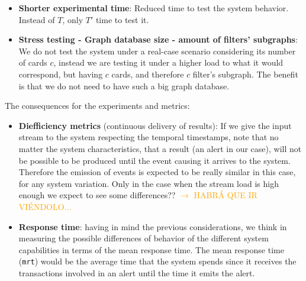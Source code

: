 \begin{itemize}
  \item \textbf{Shorter experimental time}: Reduced time to test the system behavior. Instead of $T$, only $T'$ time to test it. 
  \item \textbf{Stress testing - Graph database size - amount of filters' subgraphs}: We do not test the system under a real-case scenario considering its number of cards $c$, instead we are testing it under a higher load to what it would correspond, but having $c$ cards, and therefore $c$ filter's subgraph. The benefit is that we do not need to have such a big graph database.
\end{itemize}

The consequences for the experiments and metrics:

\begin{itemize}
  \item \textbf{Diefficiency metrics} (continuous delivery of results): If we give the input stream to the system respecting the temporal timestamps, note that no matter the system characteristics, that a result (an alert in our case), will not be possible to be produced until the event causing it arrives to the system. Therefore the emission of events is expected to be really similar in this case, for any system variation. Only in the case when the stream load is high enough we expect to see some differences?? \textcolor{orange}{$\rightarrow$ HABRÁ QUE IR VIÉNDOLO...}
  \item \textbf{Response time}: having in mind the previous considerations, we think in measuring the possible differences of behavior of the different system capabilities in terms of the mean response time. The mean response time (\texttt{mrt}) would be the average time that the system spends since it receives the transactions involved in an alert until the time it emits the alert.
\end{itemize}

